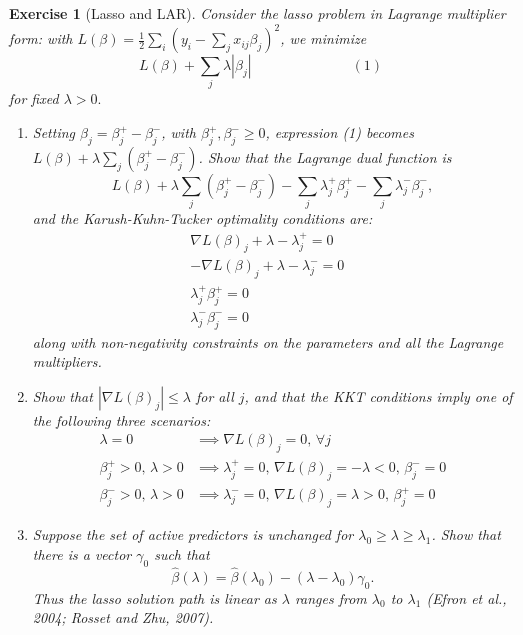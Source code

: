 \documentclass[12pt]{article}
\newtheorem{exercise}{Exercise}[section]
\begin{document}
\begin{exercise}
[Lasso and LAR] Consider the lasso problem in Lagrange multiplier form: with $L(\beta) = \frac{1}{2}\sum_i (y_i - \sum_j x_{ij} \beta_j)^2$, we minimize
$$L(\beta) + \sum_j\lambda|\beta_j| \hspace{3cm}(1)$$
for fixed $\lambda > 0.$
\begin{enumerate}
\item [(a)] Setting $\beta_j = \beta_j^+ - \beta_j^-$, with 	$\beta_j^+, \beta_j^- \geq 0$, expression (1) becomes $L(\beta) + \lambda \sum_j(\beta_j^+ - \beta_j^-)$. Show that the Lagrange dual function is 
$$L(\beta) + \lambda \sum_j(\beta_j^+ - \beta_j^-) - \sum_j \lambda_j^+\beta_j^+ - \sum_j \lambda_j^-\beta_j^-,$$
and the Karush-Kuhn-Tucker optimality conditions are:
$$
\begin{aligned}
\nabla L(\beta)_j + \lambda - \lambda_j^	+ = 0&\\
-\nabla L(\beta)_j + \lambda - \lambda_j^	- = 0&\\
\lambda_j^+\beta_j^+ = 0\\
\lambda_j^-\beta_j^- = 0
\end{aligned}
$$
along with non-negativity constraints on the parameters and all the Lagrange multipliers.

\item [(b)] Show that $|\nabla L (\beta)_j| \leq \lambda$ for all $j$, and that the KKT conditions imply one of the following three scenarios:
$$\begin{aligned}\lambda = 0 & \implies \nabla L(\beta)_j = 0, \,  \forall j \\
	\beta_j^+ > 0, \, \lambda > 0 & \implies \lambda_j^+ = 0, \, \nabla L(\beta)_j = -\lambda < 0, \,  \beta_j^- = 0 \\
	\beta_j^- > 0, \, \lambda > 0 & \implies \lambda_j^- = 0, \, \nabla L(\beta)_j = \lambda > 0, \,  \beta_j^+ = 0 
\end{aligned}
$$

\item [(c)] Suppose the set of active predictors is unchanged for $\lambda_0 \geq \lambda \geq \lambda_1$. Show that there is a vector $\gamma_0$ such that
$$ \hat{\beta}(\lambda) = \hat{\beta}(\lambda_0) - (\lambda-\lambda_0)\gamma_0.$$
Thus the lasso solution path is linear as $\lambda$ ranges from $\lambda_0$ to $\lambda_1$ (Efron et al., 2004;  Rosset and Zhu, 2007). 
\end{enumerate}
	
\end{exercise}
\end{document}
